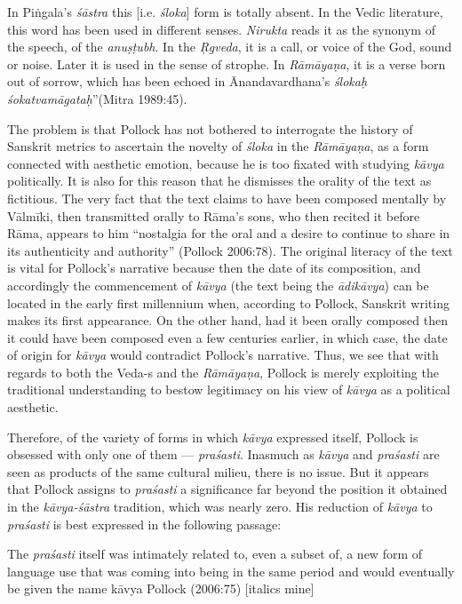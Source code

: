 \begin{myquote}
In Piṅgala's {\sl śāstra} this [i.e. {\sl śloka}] form is totally absent. In the Vedic literature, this word has been used in different senses. {\sl Nirukta} reads it as the synonym of the speech, of the {\sl anuṣṭubh}. In the {\sl Ṛgveda}, it is a call, or voice of the God, sound or noise. Later it is used in the sense of strophe. In {\sl Rāmāyaṇa}, it is a verse born out of sorrow, which has been echoed in Ānandavardhana's {\sl ślokaḥ śokatvamāgataḥ}''\hfill (Mitra 1989:45).
\end{myquote}
\vskip 1pt

The problem is that Pollock has not bothered to interrogate the history of Sanskrit metrics to ascertain the novelty of {\sl śloka} in the {\sl Rāmāyaṇa}, as a form connected with aesthetic emotion, because he is too fixated with studying {\sl kāvya} politically. It is also for this reason that he dismisses the orality of the text as fictitious. The very fact that the text claims to have been composed mentally by Vālmīki, then transmitted orally to Rāma's sons, who then recited it before Rāma, appears to him ``nostalgia for the oral and a desire to continue to share in its authenticity and authority'' (Pollock 2006:78). The original literacy of the text is vital for Pollock's narrative because then the date of its composition, and accordingly the commencement of {\sl kāvya} (the text being the {\sl ādikāvya}) can be located in the early first millennium when, according to Pollock, Sanskrit writing makes its first appearance. On the other hand, had it been orally composed then it could have been composed even a few centuries earlier, in which case, the date of origin for {\sl kāvya} would contradict Pollock's narrative. Thus, we see that with regards to both the Veda-s and the {\sl Rāmāyaṇa}, Pollock is merely exploiting the traditional understanding to bestow legitimacy on his view of {\sl kāvya} as a political aesthetic.

Therefore, of the variety of forms in which {\sl kāvya} expressed itself, Pollock is obsessed with only one of them --- {\sl praśasti}. Inasmuch as {\sl kāvya} and {\sl praśasti} are seen as products of the same cultural milieu, there is no issue. But it appears that Pollock assigns to {\sl praśasti} a significance far beyond the position it obtained in the {\sl kāvya-śāstra} tradition, which was nearly zero. His reduction of {\sl kāvya} to {\sl praśasti} is best expressed in the following passage:

\begin{myquote}
The {\sl praśasti} itself was intimately related to, even a subset of, a new form of language use that was coming into being in the same period and would eventually be given the name kāvya 
\hfill Pollock (2006:75) [italics mine]
\end{myquote}

